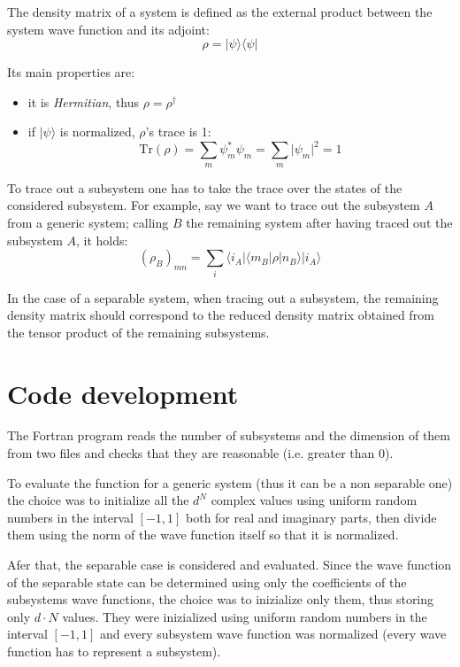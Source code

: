 \documentclass[12pt, a4paper, notitlepage]{report}
\begin{document}
The density matrix of a system is defined as the external product between the system wave function and its adjoint:
\begin{equation}
	\rho = \lvert \psi \rangle \langle \psi \rvert
\end{equation}

Its main properties are:
\begin{itemize}
	\item it is \textit{Hermitian}, thus $\rho = \rho^\dagger$
	\item if $\lvert \psi \rangle$ is normalized, $\rho$'s trace is 1:
	\begin{equation}
		\text{Tr} \left( \rho \right) = \sum_{m} \psi_m^* \psi_m = \sum_{m} \lvert \psi_m \rvert^2 = 1
	\end{equation}
\end{itemize}

To trace out a subsystem one has to take the trace over the states of the considered subsystem. For example, say we want to trace out the subsystem $A$ from a generic system; calling $B$ the remaining system after having traced out the subsystem $A$, it holds:
\begin{equation}
	\left( \rho_B \right)_{mn} = \sum_{i} \langle i_A \rvert \langle m_B \rvert \rho \lvert n_B \rangle \rvert i_A \rangle
\end{equation}

In the case of a separable system, when tracing out a subsystem, the remaining density matrix should correspond to the reduced density matrix obtained from the tensor product of the remaining subsystems.


\section*{Code development}
The Fortran program reads the number of subsystems and the dimension of them from two files and checks that they are reasonable (i.e. greater than 0).

To evaluate the function for a generic system (thus it can be a non separable one) the choice was to initialize all the $d^N$ complex values using uniform random numbers in the interval $[-1,1]$ both for real and imaginary parts, then divide them using the norm of the wave function itself so that it is normalized.

Afer that, the separable case is considered and evaluated. Since the wave function of the separable state can be determined using only the coefficients of the subsystems wave functions, the choice was to inizialize only them, thus storing only $d \cdot N$ values. They were inizialized using uniform random numbers in the interval $[-1,1]$ and every subsystem wave function was normalized (every wave function has to represent a subsystem).
\end{document}
